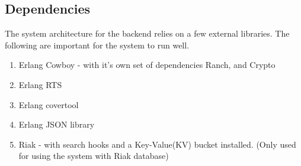 \newpage
\subsection {Dependencies}

The system architecture for the backend relies on a few external libraries. The following are important for the system to run well. 

\begin {enumerate}
\item Erlang Cowboy - with it's own set of dependencies Ranch, and Crypto
\item Erlang RTS 
\item Erlang covertool
\item Erlang JSON library
\item Riak - with search hooks and a Key-Value(KV) bucket installed.
		(Only used for using the system with Riak database)
\end {enumerate}
